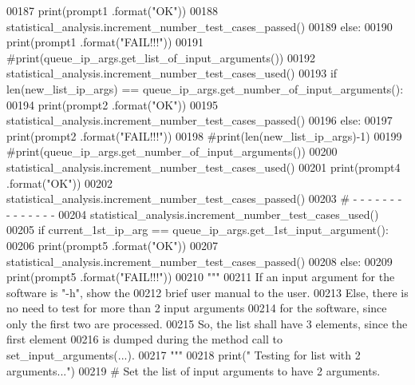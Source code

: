 \begin{DoxyCode}
00187             print(prompt1 .format(\textcolor{stringliteral}{"OK"}))
00188             statistical\_analysis.increment\_number\_test\_cases\_passed()
00189         \textcolor{keywordflow}{else}:
00190             print(prompt1 .format(\textcolor{stringliteral}{"FAIL!!!"}))
00191             \textcolor{comment}{#print(queue\_ip\_args.get\_list\_of\_input\_arguments())}
00192         statistical\_analysis.increment\_number\_test\_cases\_used()
00193         \textcolor{keywordflow}{if} len(new\_list\_ip\_args) == queue\_ip\_args.get\_number\_of\_input\_arguments():
00194             print(prompt2 .format(\textcolor{stringliteral}{"OK"}))
00195             statistical\_analysis.increment\_number\_test\_cases\_passed()
00196         \textcolor{keywordflow}{else}:
00197             print(prompt2 .format(\textcolor{stringliteral}{"FAIL!!!"}))
00198             \textcolor{comment}{#print(len(new\_list\_ip\_args)-1)}
00199             \textcolor{comment}{#print(queue\_ip\_args.get\_number\_of\_input\_arguments())}
00200         statistical\_analysis.increment\_number\_test\_cases\_used()
00201         print(prompt4 .format(\textcolor{stringliteral}{"OK"}))
00202         statistical\_analysis.increment\_number\_test\_cases\_passed()
00203         \textcolor{comment}{#   -   -   -   -   -   -   -   -   -   -   -   -   -   -}
00204         statistical\_analysis.increment\_number\_test\_cases\_used()
00205         \textcolor{keywordflow}{if} current\_1st\_ip\_arg == queue\_ip\_args.get\_1st\_input\_argument():
00206             print(prompt5 .format(\textcolor{stringliteral}{"OK"}))
00207             statistical\_analysis.increment\_number\_test\_cases\_passed()
00208         \textcolor{keywordflow}{else}:
00209             print(prompt5 .format(\textcolor{stringliteral}{"FAIL!!!"}))
00210         \textcolor{stringliteral}{"""}
00211 \textcolor{stringliteral}{            If an input argument for the software is "-h", show the}
00212 \textcolor{stringliteral}{                brief user manual to the user.}
00213 \textcolor{stringliteral}{            Else, there is no need to test for more than 2 input arguments}
00214 \textcolor{stringliteral}{                for the software, since only the first two are processed.}
00215 \textcolor{stringliteral}{            So, the list shall have 3 elements, since the first element}
00216 \textcolor{stringliteral}{                is dumped during the method call to set\_input\_arguments(...).}
00217 \textcolor{stringliteral}{        """}
00218         print(\textcolor{stringliteral}{" Testing for list with 2 arguments..."})
00219         \textcolor{comment}{#   Set the list of input arguments to have 2 arguments.}

\end{DoxyCode}
